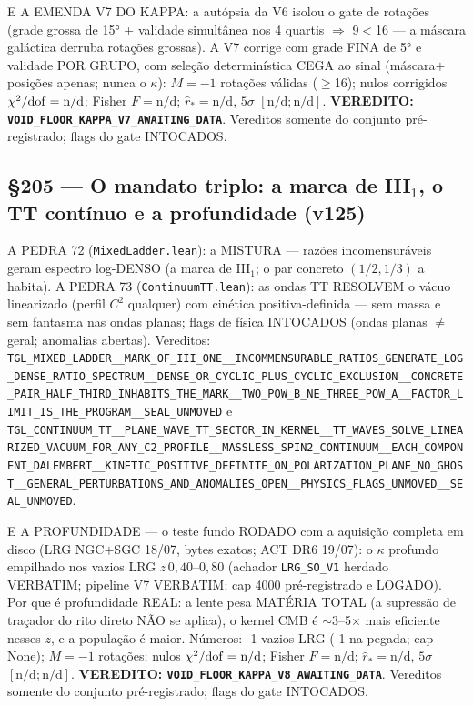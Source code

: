 \documentclass[11pt]{article}
\theoremstyle{definition}\newtheorem{deriv}{Derivação}
\begin{document}
E A EMENDA V7 DO KAPPA: a autópsia da V6 isolou o gate de rotações (grade grossa de 15° + validade simultânea nos 4 quartis $\Rightarrow$ 9$<$16 --- a máscara galáctica derruba rotações grossas). A V7 corrige com grade FINA de 5° e validade POR GRUPO, com seleção determinística CEGA ao sinal (máscara$+$posições apenas; nunca o $\kappa$): $M=-1$ rotações válidas ($\geq$16); nulos corrigidos $\chi^2/{\rm dof}=\text{n/d}$; Fisher $F=\text{n/d}$; $\hat r_*=\text{n/d}$, $5\sigma$ $[\text{n/d};\text{n/d}]$. \textbf{VEREDITO: \texttt{VOID\_FLOOR\_KAPPA\_V7\_AWAITING\_DATA}}. Vereditos somente do conjunto pré-registrado; flags do gate INTOCADOS.

\subsection*{\S205 --- O mandato triplo: a marca de III$_1$, o TT contínuo e a profundidade (v125)}A PEDRA 72 (\texttt{MixedLadder.lean}): a MISTURA — razões incomensuráveis geram espectro log-DENSO (a marca de III$_1$; o par concreto $(1/2,1/3)$ a habita). A PEDRA 73 (\texttt{ContinuumTT.lean}): as ondas TT RESOLVEM o vácuo linearizado (perfil $C^2$ qualquer) com cinética positiva-definida — sem massa e sem fantasma nas ondas planas; flags de física INTOCADOS (ondas planas $\neq$ geral; anomalias abertas). Vereditos: \texttt{TGL\_MIXED\_LADDER\_\_MARK\_OF\_III\_ONE\_\_INCOMMENSURABLE\_RATIOS\_GENERATE\_LOG\_DENSE\_RATIO\_SPECTRUM\_\_DENSE\_OR\_CYCLIC\_PLUS\_CYCLIC\_EXCLUSION\_\_CONCRETE\_PAIR\_HALF\_THIRD\_INHABITS\_THE\_MARK\_\_TWO\_POW\_B\_NE\_THREE\_POW\_A\_\_FACTOR\_LIMIT\_IS\_THE\_PROGRAM\_\_SEAL\_UNMOVED} e \texttt{TGL\_CONTINUUM\_TT\_\_PLANE\_WAVE\_TT\_SECTOR\_IN\_KERNEL\_\_TT\_WAVES\_SOLVE\_LINEARIZED\_VACUUM\_FOR\_ANY\_C2\_PROFILE\_\_MASSLESS\_SPIN2\_CONTINUUM\_\_EACH\_COMPONENT\_DALEMBERT\_\_KINETIC\_POSITIVE\_DEFINITE\_ON\_POLARIZATION\_PLANE\_NO\_GHOST\_\_GENERAL\_PERTURBATIONS\_AND\_ANOMALIES\_OPEN\_\_PHYSICS\_FLAGS\_UNMOVED\_\_SEAL\_UNMOVED}.

E A PROFUNDIDADE — o teste fundo RODADO com a aquisição completa em disco (LRG NGC$+$SGC 18/07, bytes exatos; ACT DR6 19/07): o $\kappa$ profundo empilhado nos vazios LRG $z\,0{,}40$--$0{,}80$ (achador \texttt{LRG\_SO\_V1} herdado VERBATIM; pipeline V7 VERBATIM; cap 4000 pré-registrado e LOGADO). Por que é profundidade REAL: a lente pesa MATÉRIA TOTAL (a supressão de traçador do rito direto NÃO se aplica), o kernel CMB é $\sim$3--5$\times$ mais eficiente nesses $z$, e a população é maior. Números: -1 vazios LRG (-1 na pegada; cap None); $M=-1$ rotações; nulos $\chi^2/{\rm dof}=\text{n/d}$; Fisher $F=\text{n/d}$; $\hat r_*=\text{n/d}$, $5\sigma$ $[\text{n/d};\text{n/d}]$. \textbf{VEREDITO: \texttt{VOID\_FLOOR\_KAPPA\_V8\_AWAITING\_DATA}}. Vereditos somente do conjunto pré-registrado; flags do gate INTOCADOS.
\end{document}
